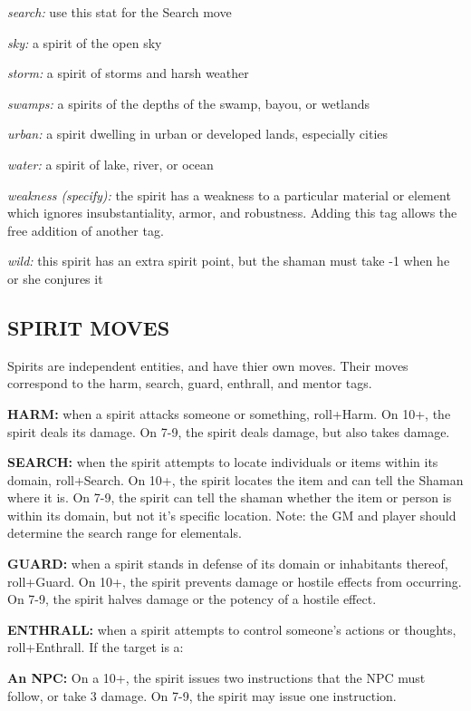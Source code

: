 \documentclass[oneside,10pt]{article}
\begin{document}
\begin{multicols}{2}
\begin{dent}
\textit{search:} use this stat for the Search move

\textit{sky:} a spirit of the open sky

\textit{storm:} a spirit of storms and harsh weather

\textit{swamps:} a spirits of the depths of the swamp, bayou, or
wetlands

\textit{urban:} a spirit dwelling in urban or developed
lands, especially cities

\textit{water:} a spirit of lake, river, or ocean 

\textit{weakness (specify):} the spirit has a weakness to a particular
material or element which ignores insubstantiality, armor,
and robustness. Adding this tag allows the free addition of
another tag.

\textit{wild:} this spirit has an extra spirit point, but the shaman
must take -1 when he or she conjures it
\end{dent}

\subsection{SPIRIT MOVES}
Spirits are independent entities, and have thier own moves.
Their moves correspond to the harm, search, guard, enthrall,
and mentor tags.

\textbf{HARM:} when a spirit attacks someone or something,
roll+Harm. On 10+, the spirit deals its damage. On 7-9, the
spirit deals damage, but also takes damage.

\textbf{SEARCH:} when the spirit attempts to locate individuals or
items within its domain, roll+Search. On 10+, the spirit locates the item and can tell the Shaman where it is. On 7-9,
the spirit can tell the shaman whether the item or person is
within its domain, but not it’s specific location. Note: the GM
and player should determine the search range for
elementals.

\textbf{GUARD:} when a spirit stands in defense of its domain or
inhabitants thereof, roll+Guard. On 10+, the spirit prevents
damage or hostile effects from occurring. On 7-9, the spirit
halves damage or the potency of a hostile effect.

\textbf{ENTHRALL:} when a spirit attempts to control someone’s
actions or thoughts, roll+Enthrall. If the target
is a:
\begin{dent}
\textbf{An NPC:} On a 10+, the spirit issues two instructions
that the NPC must follow, or take 3 damage. On 7-9,
the spirit may issue one instruction.


\end{dent}
\end{multicols}
\end{document}
